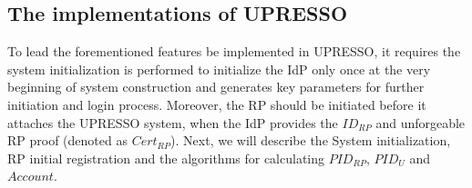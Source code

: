 \subsection{The implementations of UPRESSO}




To lead the forementioned features be implemented in UPRESSO, it requires the system initialization is performed to initialize the IdP only once at the very beginning of system construction and generates key parameters for further initiation and login process. Moreover, the RP should be initiated before it attaches the UPRESSO system, when the IdP provides the $ID_{RP}$ and unforgeable RP proof (denoted as $Cert_{RP}$). Next, we will describe the System initialization, RP initial registration and the algorithms for calculating  $PID_{RP}$, $PID_U$ and $Account$.

